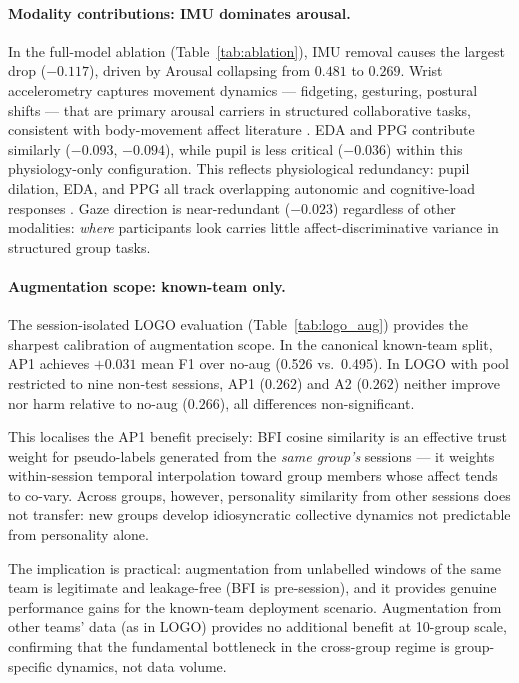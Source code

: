 \documentclass[sigconf,nonacm]{acmart}
\begin{document}
\paragraph{Modality contributions: IMU dominates arousal.}
In the full-model ablation (Table~\ref{tab:ablation}), IMU removal causes
the largest drop ($-0.117$), driven by Arousal collapsing from $0.481$ to
$0.269$.
Wrist accelerometry captures movement dynamics --- fidgeting, gesturing,
postural shifts --- that are primary arousal carriers in structured
collaborative tasks, consistent with body-movement affect literature
\cite{karg2013body}.
EDA and PPG contribute similarly ($-0.093$, $-0.094$), while pupil is
less critical ($-0.036$) within this physiology-only configuration.
This reflects physiological redundancy: pupil dilation, EDA, and PPG
all track overlapping autonomic and cognitive-load responses
\cite{kreibig2010autonomic,partala2003pupil,laeng2012pupillometry}.
Gaze direction is near-redundant ($-0.023$) regardless of other modalities:
\emph{where} participants look carries little affect-discriminative
variance in structured group tasks.

\paragraph{Augmentation scope: known-team only.}
The session-isolated LOGO evaluation (Table~\ref{tab:logo_aug}) provides the
sharpest calibration of augmentation scope.
In the canonical known-team split, AP1 achieves $+0.031$ mean F1 over no-aug
(0.526 vs.\ 0.495).
In LOGO with pool restricted to nine non-test sessions, AP1 ($0.262$) and A2
($0.262$) neither improve nor harm relative to no-aug ($0.266$), all
differences non-significant.

This localises the AP1 benefit precisely: BFI cosine similarity is an effective
trust weight for pseudo-labels generated from the \emph{same group's} sessions
--- it weights within-session temporal interpolation toward group members whose
affect tends to co-vary.
Across groups, however, personality similarity from other sessions does not
transfer: new groups develop idiosyncratic collective dynamics not predictable
from personality alone.

The implication is practical: augmentation from unlabelled windows of the same
team is legitimate and leakage-free (BFI is pre-session), and it provides
genuine performance gains for the known-team deployment scenario.
Augmentation from other teams' data (as in LOGO) provides no additional benefit
at 10-group scale, confirming that the fundamental bottleneck in the
cross-group regime is group-specific dynamics, not data volume.
\end{document}
